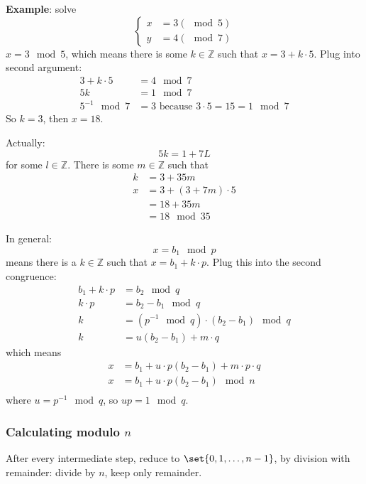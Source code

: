 \documentclass[language=english,number=]{homework}
\begin{document}
    \textbf{Example}: solve
    \[
        \begin{cases}
            x &= 3 (\mod 5) \\
            y &= 4 (\mod 7)
        \end{cases}
    \]
    $x = 3 \mod 5$, which means there is some $k \in \mathbb{Z}$ such that $x = 3 + k \cdot 5$.
    Plug into second argument:
    \begin{align*}
        3 + k \cdot 5 &= 4 \mod 7 \\
        5k &= 1 \mod 7 \\
        5^{-1} \mod 7 &= 3 \text{ because } 3 \cdot 5 = 15 = 1 \mod 7
    \end{align*}
    So $k = 3$, then $x = 18$.

    Actually:
    \[
        5k = 1 + 7 L
    \]
    for some $l \in \mathbb{Z}$.
    There is some $m \in \mathbb{Z}$ such that
    \begin{align*}
        k &= 3 + 35 m \\
        x &= 3 + (3 + 7m) \cdot 5 \\
        &= 18 + 35 m \\
        &= 18 \mod 35
    \end{align*}

    In general:
    \[
        x = b_1 \mod p
    \]
    means there is a $k \in \mathbb{Z}$ such that $x = b_1 + k \cdot p$.
    Plug this into the second congruence:
    \begin{align*}
        b_1 + k \cdot p &= b_2 \mod q  \\
        k \cdot p &= b_2 - b_1 \mod q \\
        k &= (p^{-1} \mod q) \cdot (b_2 - b_1) \mod q \\
        k &= u (b_2 - b_1) + m \cdot q
    \end{align*}
    which means
    \begin{align*}
        x &= b_1 + u \cdot p (b_2 - b_1) + m \cdot p \cdot q \\
        x &= b_1 + u \cdot p (b_2 - b_1) \mod n\\
    \end{align*}
    where $u = p^{-1} \mod q$, so $up = 1 \mod q$.

    \subsubsection{Calculating modulo $n$}

    After every intermediate step, reduce to $\set{0,1,\dots,n-1}$, by division with remainder: divide by $n$, keep only remainder.
\end{document}
